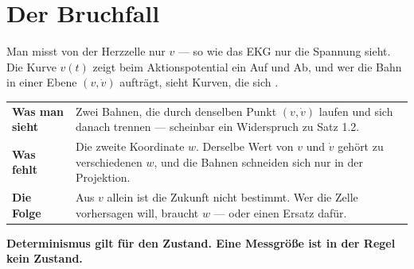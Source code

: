 \section{Der Bruchfall}

\begin{warnung}
Man misst von der Herzzelle nur $v$ --- so wie das EKG nur die Spannung sieht. Die Kurve $v(t)$ zeigt beim Aktionspotential ein Auf und Ab, und wer die Bahn in einer Ebene $(v, \dot v)$ aufträgt, sieht Kurven, die sich .

\begin{center}
{\small
\renewcommand{\arraystretch}{1.5}
\begin{tabular}{@{}P{2.8cm}P{5.8cm}@{}}
\toprule
\textbf{Was man sieht} & Zwei Bahnen, die durch denselben Punkt $(v,\dot v)$ laufen und sich danach trennen --- scheinbar ein Widerspruch zu Satz 1.2.\\
\textbf{Was fehlt} & Die zweite Koordinate $w$. Derselbe Wert von $v$ und $\dot v$ gehört zu verschiedenen $w$, und die Bahnen schneiden sich nur in der Projektion.\\
\textbf{Die Folge} & Aus $v$ allein ist die Zukunft nicht bestimmt. Wer die Zelle vorhersagen will, braucht $w$ --- oder einen Ersatz dafür.\\
\bottomrule
\end{tabular}}
\end{center}

\begin{center}
\begin{minipage}{0.9\textwidth}
\textbf{Determinismus gilt für den Zustand. Eine Messgröße ist in der Regel kein Zustand.}
\end{minipage}
\end{center}

\begin{center}
\begin{minipage}{0.88\textwidth}
\end{minipage}
\end{center}
\end{warnung}

